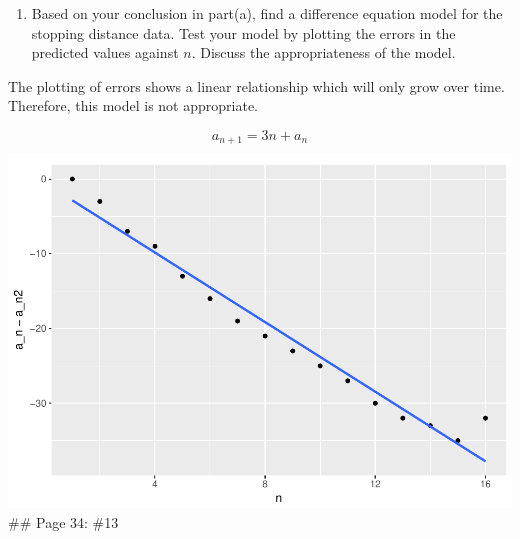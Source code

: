 \documentclass[]{article}
\newenvironment{Shaded}{\begin{snugshade}}{\end{snugshade}}
\newcommand{\KeywordTok}[1]{\textcolor[rgb]{0.13,0.29,0.53}{\textbf{{#1}}}}
\newcommand{\DataTypeTok}[1]{\textcolor[rgb]{0.13,0.29,0.53}{{#1}}}
\newcommand{\DecValTok}[1]{\textcolor[rgb]{0.00,0.00,0.81}{{#1}}}
\newcommand{\StringTok}[1]{\textcolor[rgb]{0.31,0.60,0.02}{{#1}}}
\newcommand{\OtherTok}[1]{\textcolor[rgb]{0.56,0.35,0.01}{{#1}}}
\newcommand{\NormalTok}[1]{{#1}}
\providecommand{\tightlist}{%
  \setlength{\itemsep}{0pt}\setlength{\parskip}{0pt}}
\begin{document}
\begin{enumerate}
\def\labelenumi{\alph{enumi}.}
\setcounter{enumi}{1}
\tightlist
\item
  Based on your conclusion in part(a), find a difference equation model
  for the stopping distance data. Test your model by plotting the errors
  in the predicted values against \(n\). Discuss the appropriateness of
  the model.
\end{enumerate}

The plotting of errors shows a linear relationship which will only grow
over time. Therefore, this model is not appropriate.

\[a_{n+1} = 3n+a_n\]

\begin{Shaded}
\end{Shaded}

\includegraphics{CHunt_homework1_files/figure-latex/unnamed-chunk-3-1.pdf}
\#\# Page 34: \#13
\end{document}
